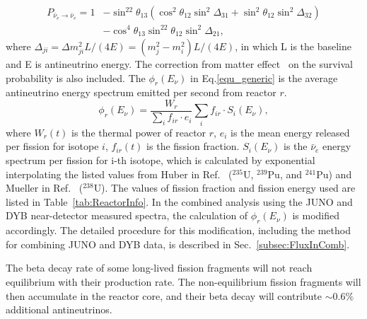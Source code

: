 \begin{equation}\label{eq:P_nue2nue}
    \begin{aligned}
        P_{\bar{\nu}_e\to\bar{\nu}_e}=1 & -\sin^22\theta_{13}(\cos^2\theta_{12}\sin^2\Delta_{31}+\sin^2\theta_{12}\sin^2\Delta_{32}) \\
                                        & -\cos^4\theta_{13}\sin^22\theta_{12}\sin^2\Delta_{21},
    \end{aligned}
\end{equation}
where $\Delta_{ji}=\Delta m_{ji}^2L/(4E)=(m_j^2-m_i^2)L/(4E)$, in which L is the baseline and E is antineutrino energy. The correction from matter effect~\cite{Khan:2019doq} on the survival probability is also included. The $\phi_r(E_{\nu})$ in Eq.\eqref{equ_generic} is the average antineutrino energy spectrum emitted per second from reactor $r$. 
\begin{equation}\label{equ_prediction}
    \phi_r(E_{\nu}) = \frac{W_r}{\sum_i f_{ir} \cdot e_i}\sum_i f_{ir} \cdot S_i(E_{\nu}),
\end{equation}
where $W_r(t)$ is the thermal power of reactor $r$, $e_i$ is the mean energy released per fission for isotope $i$, $f_{ir}(t)$ is the fission fraction. $S_i(E_{\nu})$ is the $\bar\nu_e$ energy spectrum per fission for i-th isotope, which is calculated by exponential interpolating the listed values from Huber in Ref.~\cite{Huber:2011wv} ($^{235}$U, $^{239}$Pu, and $^{241}$Pu) and Mueller in Ref.~\cite{Mueller:2011nm} ($^{238}$U). The values of fission fraction and fission energy used are listed in Table~\ref{tab:ReactorInfo}.
In the combined analysis using the JUNO and DYB near-detector measured spectra, the calculation of $\phi_r(E_{\nu})$ is modified accordingly. The detailed procedure for this modification, including the method for combining JUNO and DYB data, is described in Sec.~\ref{subsec:FluxInComb}.

The beta decay rate of some long-lived fission fragments will not reach equilibrium with their production rate. The non-equilibrium fission fragments will then accumulate in the reactor core, and their beta decay will contribute $\sim$0.6\% additional antineutrinos\cite{Mueller:2011nm}.

